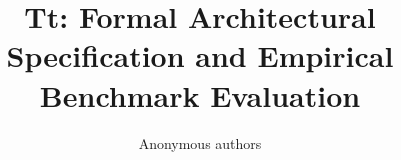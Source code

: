 \title{\textbf{Tt: Formal Architectural Specification and Empirical Benchmark Evaluation}}

\author{Anonymous authors}

